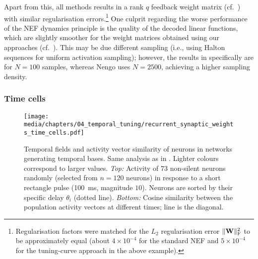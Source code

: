 Apart from this, all methods results in a rank $q$ feedback weight matrix (cf.~) with similar regularisation errors.\footnote{Regularisation factors were matched for the $L_2$ regularisation error $\|\mathbf{W}\|_\mathrm{F}^2$ to be approximately equal (about $4 \times 10^{-4}$ for the standard NEF and $5 \times 10^{-4}$ for the tuning-curve approach in the above example).}
One culprit regarding the worse performance of the NEF dynamics principle is the quality of the decoded linear functions, which are slightly smoother for the weight matrices obtained using our approaches (cf.~).
This may be due different sampling (i.e., using Halton sequences for uniform activation sampling); however, the results in  specifically are for $N = 100$ samples, whereas Nengo uses $N = 2500$, achieving a higher sampling density.

\subsubsection{Time cells}

\begin{figure}
	\centering
	\texttt{[image: media/chapters/04\_temporal\_tuning/recurrent\_synaptic\_weights\_time\_cells.pdf]}%
	{\label{fig:recurrent_synaptic_weights_time_cells_a}}%
	{\label{fig:recurrent_synaptic_weights_time_cells_b}}%
	{\label{fig:recurrent_synaptic_weights_time_cells_c}}%
	\caption[Temporal fields and activity vector similarity of networks generating temporal bases]{
		Temporal fields and activity vector similarity of neurons in networks generating temporal bases.
		Same analysis as in .
		Lighter colours correspond to larger values.
		\emph{Top:} Activity of $73$ non-silent neurons randomly (selected from $n = 120$ neurons) in response to a short rectangle pulse (\SI{100}{\milli\second}, magnitude $10$). Neurons are sorted by their specific delay $\theta_i$ (dotted line).
		\emph{Bottom:} Cosine similarity between the population activity vectors at different times; line is the diagonal.
	}
%		
	\label{fig:recurrent_synaptic_weights_time_cells}
\end{figure}


